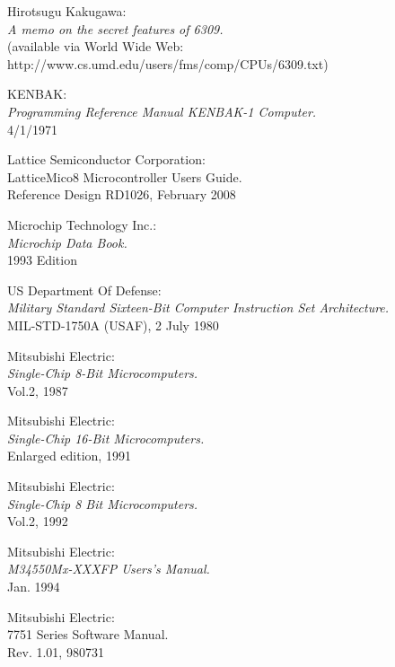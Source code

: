  Hirotsugu Kakugawa: \\
               {\em A memo on the secret features of 6309.\/} \\
    	       (available via World Wide Web: \\
      	       http://www.cs.umd.edu/users/fms/comp/CPUs/6309.txt)

 KENBAK: \\
               {\em Programming Reference Manual KENBAK-1 Computer.} \\
               4/1/1971

 Lattice Semiconductor Corporation: \\
                   {LatticeMico8 Microcontroller Users Guide.\/} \\
                   Reference Design RD1026, February 2008

 Microchip Technology Inc.: \\
                    {\em Microchip Data Book.\/} \\
                    1993 Edition

 US Department Of Defense: \\
                  {\em Military Standard Sixteen-Bit Computer
                  Instruction Set Architecture.\/} \\
                  MIL-STD-1750A (USAF), 2 July 1980

 Mitsubishi Electric: \\
                {\em Single-Chip 8-Bit Microcomputers.\/} \\
                Vol.2, 1987

 Mitsubishi Electric: \\
                {\em Single-Chip 16-Bit Microcomputers.\/} \\
                Enlarged edition, 1991

 Mitsubishi Electric: \\
               {\em Single-Chip 8 Bit Microcomputers.\/} \\
               Vol.2, 1992

 Mitsubishi Electric: \\
                  {\em M34550Mx-XXXFP Users's Manual.\/} \\
                  Jan. 1994

 Mitsubishi Electric: \\
                  { 7751 Series Software Manual.\/} \\
                  Rev. 1.01, 980731

